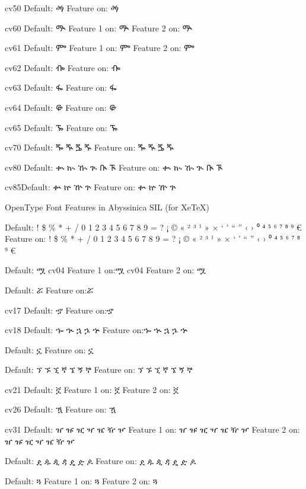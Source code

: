 \IndSS cv50 Default: ፙ
\IndSS\fifty Feature on: ፙ

\IndSS cv60 Default: ᎁ
\IndSS\sixtyone Feature 1 on: ᎁ
\IndSS\sixtytwo Feature 2 on: ᎁ

\IndSS cv61 Default: ᎃ
\IndSS\sixtyoneone Feature 1 on: ᎃ
\IndSS\sixtyonetwo Feature 2 on: ᎃ

\IndSS cv62 Default: ᎇ
\IndSS\sixtytwoone Feature on: ᎇ

\IndSS cv63 Default: ᎊ
\IndSS\sixtythree Feature on: ᎊ

\IndSS cv64 Default: ᎋ
\IndSS\sixtyfour Feature on: ᎋ

\IndSS cv65 Default: ᎏ
\IndSS\sixtyfive Feature on: ᎏ

\IndSS cv70 Default: ⶓ ⶔ ⶕ ⶖ
\IndSS\seventy Feature on: ⶓ ⶔ ⶕ ⶖ

\IndSS cv80 Default: ቊ ኲ ዂ ጒ ᎅ ᎍ
\IndSS\eighty Feature on: ቊ ኲ ዂ ጒ ᎅ ᎍ

\IndSS cv85Default: ቍ ኵ ዅ ጕ 
\IndSS\eightyfive Feature on: ቍ ኵ ዅ ጕ


\A OpenType Font Features in Abyssinica SIL (for XeTeX)


\IndSS Default: ! \$ \% * + / 0 1 2 3 4 5 6 7 8 9 = ? ¡ © « ² ³ ¹ » × ‘ ’ “ ” ‹ › ⁰ ⁴ ⁵ ⁶ ⁷ ⁸ ⁹ €
\IndSS\OTone Feature on: ! \$ \% * + / 0 1 2 3 4 5 6 7 8 9 = ? ¡ © « ² ³ ¹ » × ‘ ’ “ ” ‹ › ⁰ ⁴ ⁵ ⁶ ⁷ ⁸ ⁹ €


\IndSS Default: ሟ
\IndSS\OTfourone cv04 Feature 1 on:ሟ
\IndSS\OTfourtwo cv04 Feature 2 on: ሟ

\IndSS Default: ሯ
\IndSS\OTfive Feature on:ሯ

\IndSS cv17 Default: ኇ
\IndSS\OTseventeen Feature on:ኇ

\IndSS cv18 Default: ኈ ኊ ኋ ኌ ኍ
\IndSS\OTeighteen Feature on:ኈ ኊ ኋ ኌ ኍ

\IndSS Default: ኗ
\IndSS\OTnineteen Feature on: ኗ

\IndSS Default: ኘ ኙ ኚ ኛ ኜ ኝ ኞ
\IndSS\OTtwenty Feature on: ኘ ኙ ኚ ኛ ኜ ኝ ኞ

\IndSS cv21 Default: ኟ
\IndSS\OTtwentyoneone Feature 1 on: ኟ
\IndSS\OTtwentyonetwo Feature 2 on: ኟ

\IndSS cv26 Default: ዃ
\IndSS\OTtwentysix Feature on: ዃ

\IndSS cv31 Default: ዠ ዡ ዢ ዣ ዤ ዥ ዦ
\IndSS\OTthirtyoneone Feature 1 on: ዠ ዡ ዢ ዣ ዤ ዥ ዦ
\IndSS\OTthirtyonetwo Feature 2 on: ዠ ዡ ዢ ዣ ዤ ዥ ዦ

\IndSS Default: ዸ ዹ ዺ ዻ ዼ ዽ ዾ
\IndSS\OTthirtytwo Feature on: ዸ ዹ ዺ ዻ ዼ ዽ ዾ

\IndSS Default: ጓ
\IndSS\OTfortyone Feature 1 on: ጓ
\IndSS\OTfortytwo Feature 2 on: ጓ

